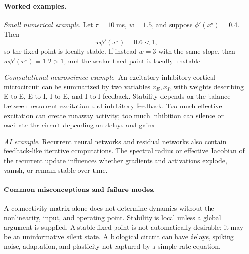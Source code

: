 \paragraph{Worked examples.}
\emph{Small numerical example.}
Let \(\tau=10\) ms, \(w=1.5\), and suppose \(\phi'(x^\star)=0.4\). Then
\[
w\phi'(x^\star)=0.6<1,
\]
so the fixed point is locally stable. If instead \(w=3\) with the same slope, then \(w\phi'(x^\star)=1.2>1\), and the scalar fixed point is locally unstable.

\emph{Computational neuroscience example.}
An excitatory-inhibitory cortical microcircuit can be summarized by two variables \(x_E,x_I\), with weights describing E-to-E, E-to-I, I-to-E, and I-to-I feedback. Stability depends on the balance between recurrent excitation and inhibitory feedback. Too much effective excitation can create runaway activity; too much inhibition can silence or oscillate the circuit depending on delays and gains.

\emph{AI example.}
Recurrent neural networks and residual networks also contain feedback-like iterative computations. The spectral radius or effective Jacobian of the recurrent update influences whether gradients and activations explode, vanish, or remain stable over time.

\paragraph{Common misconceptions and failure modes.}
A connectivity matrix alone does not determine dynamics without the nonlinearity, input, and operating point. Stability is local unless a global argument is supplied. A stable fixed point is not automatically desirable; it may be an uninformative silent state. A biological circuit can have delays, spiking noise, adaptation, and plasticity not captured by a simple rate equation.

